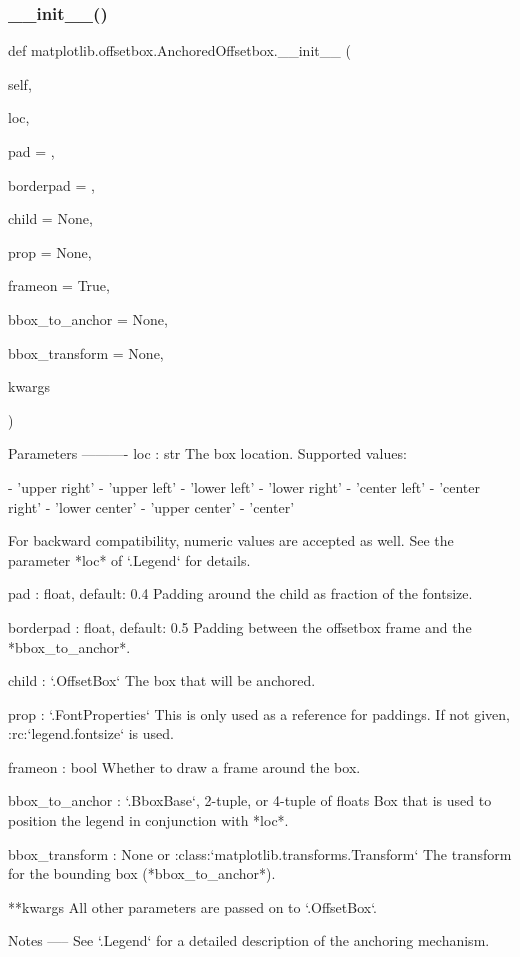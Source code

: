 \subsubsection{\texorpdfstring{\+\_\+\+\_\+init\+\_\+\+\_\+()}{\_\_init\_\_()}}
{\footnotesize\ttfamily def matplotlib.\+offsetbox.\+Anchored\+Offsetbox.\+\_\+\+\_\+init\+\_\+\+\_\+ (\begin{DoxyParamCaption}\item[{}]{self,  }\item[{}]{loc,  }\item[{}]{pad = {},  }\item[{}]{borderpad = {},  }\item[{}]{child = {\ttfamily None},  }\item[{}]{prop = {\ttfamily None},  }\item[{}]{frameon = {\ttfamily True},  }\item[{}]{bbox\+\_\+to\+\_\+anchor = {\ttfamily None},  }\item[{}]{bbox\+\_\+transform = {\ttfamily None},  }\item[{}]{kwargs }\end{DoxyParamCaption})}

\begin{DoxyVerb}Parameters
----------
loc : str
    The box location. Supported values:

    - 'upper right'
    - 'upper left'
    - 'lower left'
    - 'lower right'
    - 'center left'
    - 'center right'
    - 'lower center'
    - 'upper center'
    - 'center'

    For backward compatibility, numeric values are accepted as well.
    See the parameter *loc* of `.Legend` for details.

pad : float, default: 0.4
    Padding around the child as fraction of the fontsize.

borderpad : float, default: 0.5
    Padding between the offsetbox frame and the *bbox_to_anchor*.

child : `.OffsetBox`
    The box that will be anchored.

prop : `.FontProperties`
    This is only used as a reference for paddings. If not given,
    :rc:`legend.fontsize` is used.

frameon : bool
    Whether to draw a frame around the box.

bbox_to_anchor : `.BboxBase`, 2-tuple, or 4-tuple of floats
    Box that is used to position the legend in conjunction with *loc*.

bbox_transform : None or :class:`matplotlib.transforms.Transform`
    The transform for the bounding box (*bbox_to_anchor*).

**kwargs
    All other parameters are passed on to `.OffsetBox`.

Notes
-----
See `.Legend` for a detailed description of the anchoring mechanism.
\end{DoxyVerb}
 

